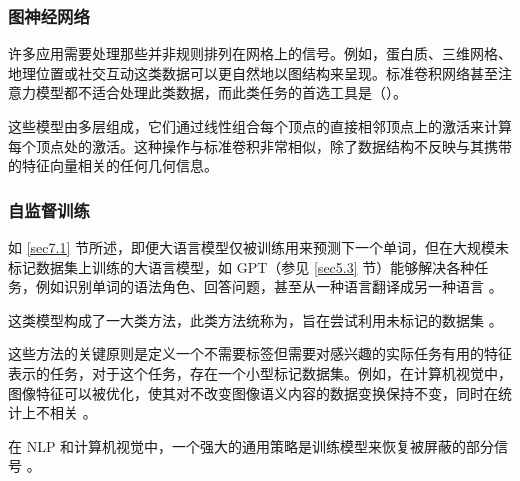\subsubsection*{图神经网络}

许多应用需要处理那些并非规则排列在网格上的信号。例如，蛋白质、三维网格、地理位置或社交互动这类数据可以更自然地以图结构来呈现。标准卷积网络甚至注意力模型都不适合处理此类数据，而此类任务的首选工具是（）\citep{gnn}。

这些模型由多层组成，它们通过线性组合每个顶点的直接相邻顶点上的激活来计算每个顶点处的激活。这种操作与标准卷积非常相似，除了数据结构不反映与其携带的特征向量相关的任何几何信息。

\subsubsection*{自监督训练}

如 \ref{sec7.1} 节所述，即便大语言模型仅被训练用来预测下一个单词，但在大规模未标记数据集上训练的大语言模型，如 GPT（参见 \ref{sec5.3} 节）能够解决各种任务，例如识别单词的语法角色、回答问题，甚至从一种语言翻译成另一种语言 \citep{Radford2019}。

这类模型构成了一大类方法，此类方法统称为，旨在尝试利用未标记的数据集 \citep{arxiv-2304.12210}。

这些方法的关键原则是定义一个不需要标签但需要对感兴趣的实际任务有用的特征表示的任务，对于这个任务，存在一个小型标记数据集。例如，在计算机视觉中，图像特征可以被优化，使其对不改变图像语义内容的数据变换保持不变，同时在统计上不相关 \citep{arxiv-2103.03230}。

在 NLP 和计算机视觉中，一个强大的通用策略是训练模型来恢复被屏蔽的部分信号 \citep{arxiv-1810.04805, arxiv-2111.07832}。